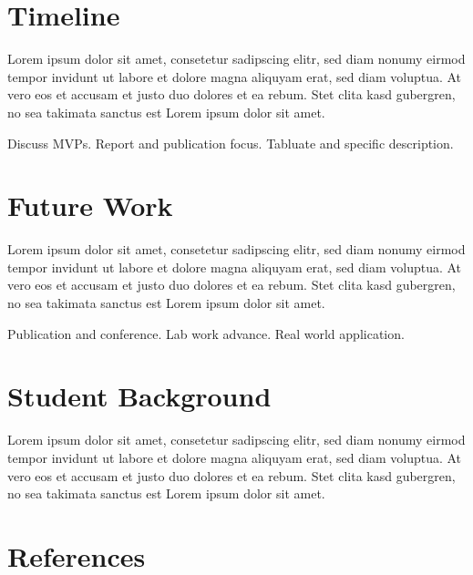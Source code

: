 \documentclass[12pt]{article}
\begin{document}
\section{Timeline}

Lorem ipsum dolor sit amet, consetetur sadipscing elitr, sed diam nonumy eirmod tempor invidunt ut labore et dolore magna aliquyam erat, sed diam voluptua. At vero eos et accusam et justo duo dolores et ea rebum. Stet clita kasd gubergren, no sea takimata sanctus est Lorem ipsum dolor sit amet.

Discuss MVPs. Report and publication focus. Tabluate and specific description.

\section{Future Work}


Lorem ipsum dolor sit amet, consetetur sadipscing elitr, sed diam nonumy eirmod tempor invidunt ut labore et dolore magna aliquyam erat, sed diam voluptua. At vero eos et accusam et justo duo dolores et ea rebum. Stet clita kasd gubergren, no sea takimata sanctus est Lorem ipsum dolor sit amet.

Publication and conference. Lab work advance. Real world application.

\section{Student Background}

Lorem ipsum dolor sit amet, consetetur sadipscing elitr, sed diam nonumy eirmod tempor invidunt ut labore et dolore magna aliquyam erat, sed diam voluptua. At vero eos et accusam et justo duo dolores et ea rebum. Stet clita kasd gubergren, no sea takimata sanctus est Lorem ipsum dolor sit amet.

\section*{References}
\end{document}

